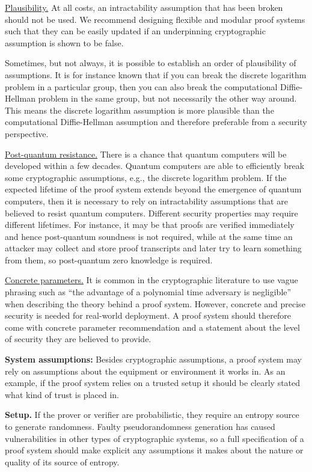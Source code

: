 \underline{Plausibility.} At all costs, an intractability assumption that has been broken should not be used. We recommend designing flexible and modular proof systems such that they can be easily updated if an underpinning cryptographic assumption is shown to be false. 

Sometimes, but not always, it is possible to establish an order of plausibility of assumptions. It is for instance known that if you can break the discrete logarithm problem in a particular group, then you can also break the computational Diffie-Hellman problem in the same group, but not necessarily the other way around. This means the discrete logarithm assumption is more plausible than the computational Diffie-Hellman assumption and therefore preferable from a security perspective.
 
\underline{Post-quantum resistance.} There is a chance that quantum computers will be developed within a few decades. Quantum computers are able to efficiently break some cryptographic assumptions, e.g., the discrete logarithm problem. If the expected lifetime of the proof system extends beyond the emergence of quantum computers, then it is necessary to rely on intractability assumptions that are believed to resist quantum computers.    	
Different security properties may require different lifetimes. For instance, it may be that proofs are verified immediately and hence post-quantum soundness is not required, while at the same time an attacker may collect and store proof transcripts and later try to learn something from them, so post-quantum zero knowledge is required.
 
\underline{Concrete parameters.} It is common in the cryptographic literature to use vague phrasing such as “the advantage of a polynomial time adversary is negligible” when describing the theory behind a proof system. However, concrete and precise security is needed for real-world deployment. A proof system should therefore come with concrete parameter recommendation and a statement about the level of security they are believed to provide.  
 
\textbf{System assumptions:} Besides cryptographic assumptions, a proof system may rely on assumptions about the equipment or environment it works in.
As an example, if the proof system relies on a trusted setup it should be clearly stated what kind of trust is placed in.

\textbf{Setup.} If the prover or verifier are probabilistic, they require an entropy source to generate randomness. 
Faulty pseudorandomness generation has caused vulnerabilities in other types of cryptographic systems, so a full specification of a proof system should make explicit any assumptions it makes about the nature or quality of its source of entropy.



